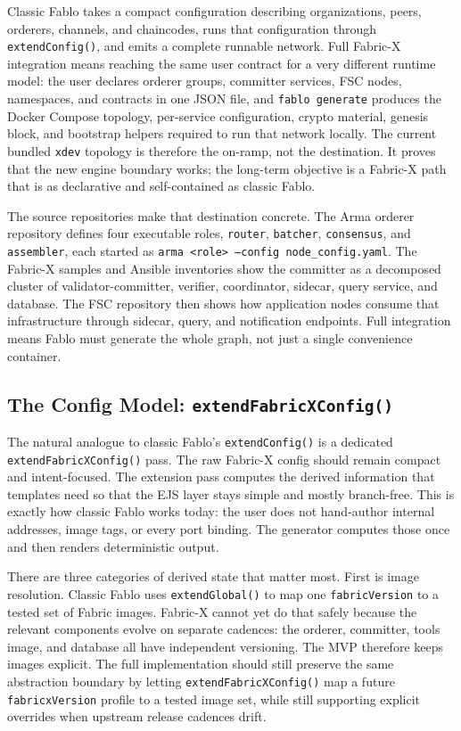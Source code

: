 Classic Fablo takes a compact configuration describing organizations, peers, orderers, channels, and chaincodes, runs that configuration through \texttt{extendConfig()}, and emits a complete runnable network. Full Fabric-X integration means reaching the same user contract for a very different runtime model: the user declares orderer groups, committer services, FSC nodes, namespaces, and contracts in one JSON file, and \texttt{fablo generate} produces the Docker Compose topology, per-service configuration, crypto material, genesis block, and bootstrap helpers required to run that network locally. The current bundled \texttt{xdev} topology is therefore the on-ramp, not the destination. It proves that the new engine boundary works; the long-term objective is a Fabric-X path that is as declarative and self-contained as classic Fablo.

The source repositories make that destination concrete. The Arma orderer repository defines four executable roles, \texttt{router}, \texttt{batcher}, \texttt{consensus}, and \texttt{assembler}, each started as \texttt{arma <role> --config node\_config.yaml}. The Fabric-X samples and Ansible inventories show the committer as a decomposed cluster of validator-committer, verifier, coordinator, sidecar, query service, and database. The FSC repository then shows how application nodes consume that infrastructure through sidecar, query, and notification endpoints. Full integration means Fablo must generate the whole graph, not just a single convenience container.

\subsection{The Config Model: \texttt{extendFabricXConfig()}}

The natural analogue to classic Fablo's \texttt{extendConfig()} is a dedicated \texttt{extendFabricXConfig()} pass. The raw Fabric-X config should remain compact and intent-focused. The extension pass computes the derived information that templates need so that the EJS layer stays simple and mostly branch-free. This is exactly how classic Fablo works today: the user does not hand-author internal addresses, image tags, or every port binding. The generator computes those once and then renders deterministic output.

There are three categories of derived state that matter most. First is image resolution. Classic Fablo uses \texttt{extendGlobal()} to map one \texttt{fabricVersion} to a tested set of Fabric images. Fabric-X cannot yet do that safely because the relevant components evolve on separate cadences: the orderer, committer, tools image, and database all have independent versioning. The MVP therefore keeps images explicit. The full implementation should still preserve the same abstraction boundary by letting \texttt{extendFabricXConfig()} map a future \texttt{fabricxVersion} profile to a tested image set, while still supporting explicit overrides when upstream release cadences drift.

